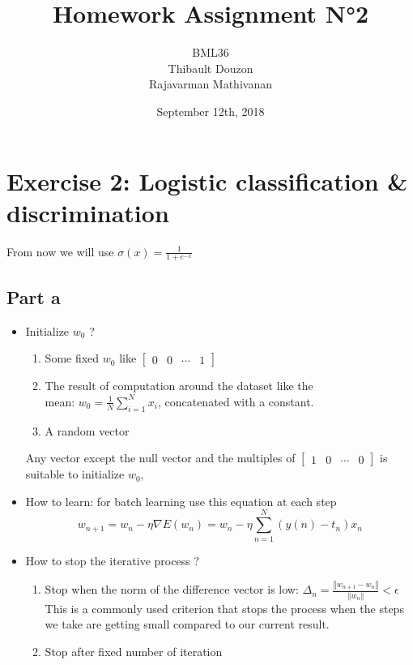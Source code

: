 \documentclass[a4paper, 10pt]{article}
\title{Homework Assignment N°2}
\author{BML36\\Thibault Douzon\\Rajavarman Mathivanan}
\date{September 12th, 2018}
\begin{document}
\maketitle

\pagebreak

\tableofcontents
\pagebreak

\section{Exercise 2: Logistic classification \& discrimination}
From now we will use $\sigma(x)=\frac{1}{1+e^{-x}}$
\subsection{Part a}
\begin{itemize}[label=$\square$]
    \item Initialize $w_0$ ?
    \begin{enumerate}
        \item Some fixed $w_0$ like $\begin{bmatrix}0 & 0 & \cdots & 1\end{bmatrix}$
        \item The result of computation around the dataset like the \\mean: $w_0 = \frac{1}{N}\sum_{i=1}^N x_i$, 
        concatenated with a constant.
        \item A random vector
    \end{enumerate}
    Any vector except the null vector and the multiples of $\begin{bmatrix}1 & 0 & \cdots &0\end{bmatrix}$ is suitable to initialize $w_0$, 
    \item How to learn: for batch learning use this equation at each step
    $$
    w_{n+1} = w_n - \eta \nabla E(w_n) = w_n - \eta \sum_{n=1}^{N}\left(y(n)-t_n\right)x_n
    $$
    \item How to stop the iterative process ?
    \begin{enumerate}
    \item Stop when the norm of the difference vector is low: $\Delta_n = \frac{\left\Vert w_{n+1} - w_n\right\Vert}{\left\Vert w_n \right\Vert} < \epsilon$
    \\
    This is a commonly used criterion that stops the process when the steps we take are getting small compared to our current result.
    \item Stop after fixed number of iteration

\end{enumerate}
\end{itemize}
\end{document}
